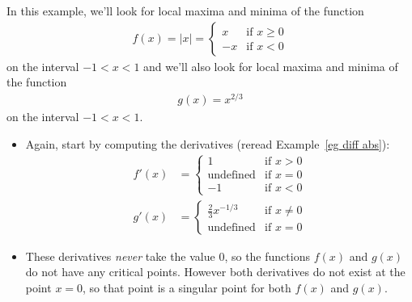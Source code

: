 \begin{eg}\label{eg:localMinMaxC}
In this example, we'll look for local maxima and minima of the function
\begin{align*}
f(x) = |x| = \begin{cases}
           x  & \text{if }x \ge 0 \\
           -x & \text{if }x <  0
       \end{cases}
\end{align*}
on the interval $-1< x< 1$ and we'll also look for local maxima and minima of the function
\begin{align*}
g(x) = x^{2/3}
\end{align*}
on the interval $-1< x< 1$.
\begin{itemize}
 \item Again, start by computing the derivatives (reread Example~\ref{eg diff
abs}):
\begin{align*}
f'(x) &= \begin{cases}
           1  & \text{if }x > 0 \\
           \text{undefined}  & \text{if }x = 0 \\
           -1 & \text{if }x <  0
       \end{cases}
\\
g'(x) &= \begin{cases}
           \frac{2}{3} x^{-1/3} & \text{if }x \ne 0 \\
           \text{undefined}  & \text{if }x = 0 
       \end{cases}
\end{align*}
\item These derivatives \emph{never} take the value $0$, so the functions
$f(x)$ and $g(x)$ do not have any critical points. However both derivatives do not exist at the point $x=0$, so that point is a singular point for both $f(x)$ and $g(x)$.


\end{itemize}
\end{eg}
